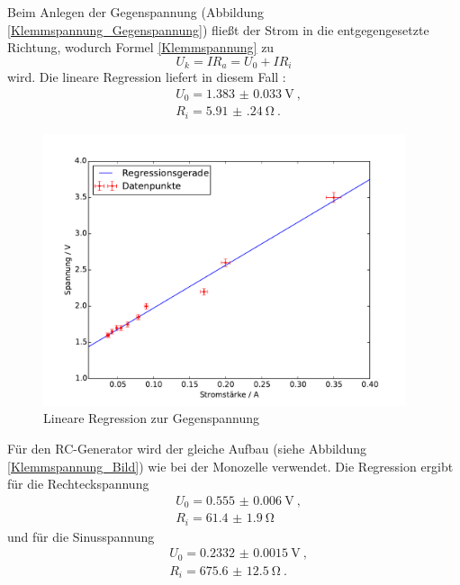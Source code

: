 Beim Anlegen der Gegenspannung (Abbildung \ref{Klemmspannung_Gegenspannung}) fließt der Strom in die entgegengesetzte Richtung, wodurch Formel \eqref{Klemmspannung} zu
\begin{equation}
U_k = IR_a = U_0+IR_i
\end{equation}
wird. Die lineare Regression liefert in diesem Fall :
\begin{align}
&U_0 = \SI{1.383(33)}{\volt} \ , \\
&R_i = \SI{5.91(24)}{\ohm}  \ .
\end{align}
\begin{figure}[h!]
	\centering
	\includegraphics[width=0.95\textwidth]{Spannung_Messung_c.pdf}
	\caption{Lineare Regression zur Gegenspannung}
	\label{fig:Regression_Gegenspannung}
\end{figure}


Für den RC-Generator wird der gleiche Aufbau (siehe Abbildung \ref{Klemmspannung_Bild}) wie bei der Monozelle verwendet. Die Regression ergibt für die Rechteckspannung
\begin{align}
&U_0 = \SI{0.555(6)}{\volt} \ , \\
&R_i = \SI{61.4(19)}{\ohm} 
\end{align}
und für die Sinusspannung
\begin{align}
&U_0 = \SI{0.2332(15)}{\volt} \ , \\
&R_i = \SI{675.6(125)}{\ohm} \ .
\end{align}







